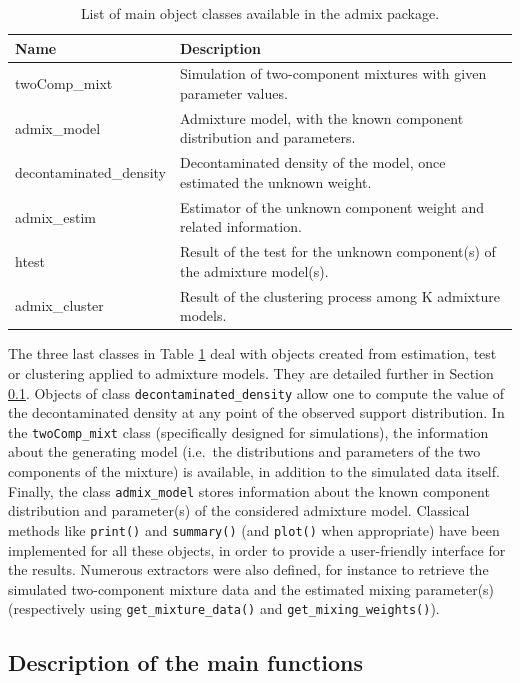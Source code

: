 \begin{table}[!h]
\centering
\caption{\label{tab:classList-latex}List of main object classes available in the admix package.}
\centering
\fontsize{8}{10}\selectfont
\begin{tabular}[t]{ll}
\toprule
Name & Description\\
\midrule
twoComp\_mixt & Simulation of two-component mixtures with given parameter values.\\
admix\_model & Admixture model, with the known component distribution and parameters.\\
decontaminated\_density & Decontaminated density of the model, once estimated the unknown weight.\\
admix\_estim & Estimator of the unknown component weight and related information.\\
htest & Result of the test for the unknown component(s) of the admixture model(s).\\
admix\_cluster & Result of the clustering process among K admixture models.\\
\bottomrule
\end{tabular}
\end{table}

The three last classes in Table \ref{tab:classList-latex} deal with objects created from estimation, test or clustering applied to admixture models. They are detailed further in Section \ref{sec:mainFunctions}. Objects of class \texttt{decontaminated\_density} allow one to compute the value of the decontaminated density at any point of the observed support distribution. In the \texttt{twoComp\_mixt} class (specifically designed for simulations), the information about the generating model (i.e.~the distributions and parameters of the two components of the mixture) is available, in addition to the simulated data itself. Finally, the class \texttt{admix\_model} stores information about the known component distribution and parameter(s) of the considered admixture model.
Classical methods like \texttt{print()} and \texttt{summary()} (and \texttt{plot()} when appropriate) have been implemented for all these objects, in order to provide a user-friendly interface for the results. Numerous extractors were also defined, for instance to retrieve the simulated two-component mixture data and the estimated mixing parameter(s) (respectively using \texttt{get\_mixture\_data()} and \texttt{get\_mixing\_weights()}).

\subsection{Description of the main functions}\label{sec:mainFunctions}

